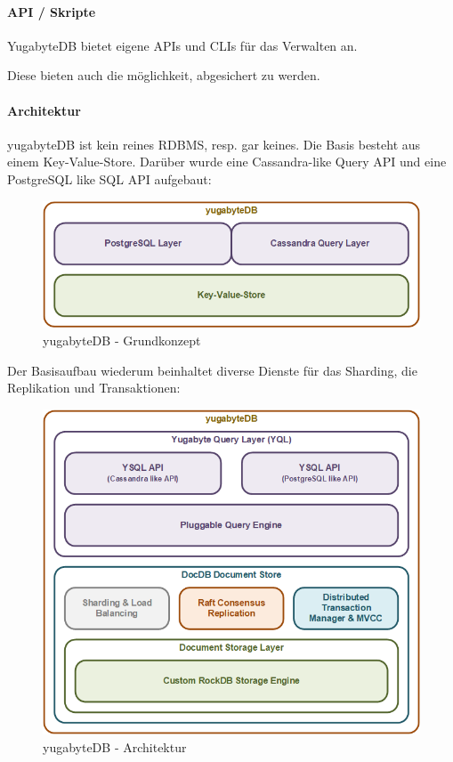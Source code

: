 \begin{flushleft}
    \paragraph{API / Skripte}
    YugabyteDB bietet eigene APIs\cite{ZXXLVVYW} und CLIs\cite{8846IPNK} für das Verwalten an.
\end{flushleft}
\begin{flushleft}
    Diese bieten auch die möglichkeit, abgesichert zu werden.
\end{flushleft}
\begin{flushleft}
    \paragraph{Architektur}
    yugabyteDB ist kein reines \Gls{RDBMS}, resp. gar keines.
    Die Basis besteht aus einem \Gls{Key-Value-Store}.
    Darüber wurde eine \Gls{Cassandra}-like Query API und eine PostgreSQL like SQL API aufgebaut:
    \begin{figure}[H]
        \centering
        \includegraphics[width=0.8\linewidth]{source/implementation/evaluation/postgresql_ha_solutions/yugabytedb/yugabytedb-concept}
        \caption{yugabyteDB - Grundkonzept}
        \label{fig:yugabytedb-concept}
    \end{figure}
\end{flushleft}
\begin{flushleft}
    Der Basisaufbau wiederum beinhaltet diverse Dienste für das Sharding, die Replikation und Transaktionen:
    \begin{figure}[H]
        \centering
        \includegraphics[width=0.8\linewidth]{source/implementation/evaluation/postgresql_ha_solutions/yugabytedb/yugabytedb-basic-archicture}
        \caption{yugabyteDB - Architektur}
        \label{fig:yugabytedb-basic-archicture}
    \end{figure}
\end{flushleft}
